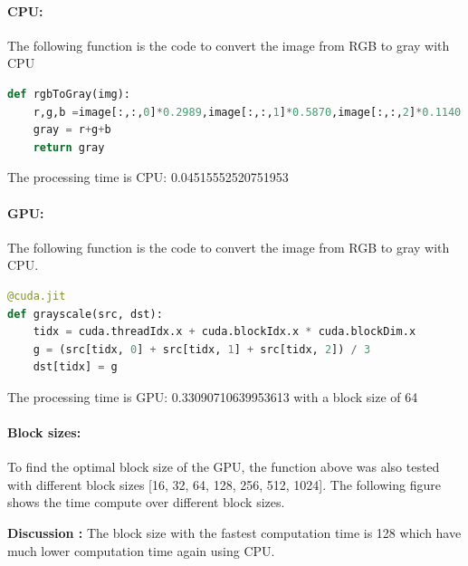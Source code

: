 \documentclass{article}
\begin{document}
\paragraph{CPU:} The following function is the code to convert the image from RGB to gray with CPU
\begin{lstlisting}[language=Python]
def rgbToGray(img):
    r,g,b =image[:,:,0]*0.2989,image[:,:,1]*0.5870,image[:,:,2]*0.1140
    gray = r+g+b
    return gray
\end{lstlisting}
The processing time is CPU: 0.04515552520751953

\paragraph{GPU:} The following function is the code to convert the image from RGB to gray with CPU. 
\begin{lstlisting}[language=Python]
@cuda.jit
def grayscale(src, dst):
    tidx = cuda.threadIdx.x + cuda.blockIdx.x * cuda.blockDim.x
    g = (src[tidx, 0] + src[tidx, 1] + src[tidx, 2]) / 3
    dst[tidx] = g
\end{lstlisting}
The processing time is GPU: 0.33090710639953613 with a block size of 64


\paragraph{Block sizes:} To find the optimal block size of the GPU, the function above was also tested with different block sizes [16, 32, 64, 128, 256, 512, 1024]. The following figure shows the time compute over different block sizes.

\begin{figure}[H]
\end{figure}

\textbf{Discussion :} The block size with the fastest computation time is 128 which have much lower computation time again using CPU.
\end{document}
